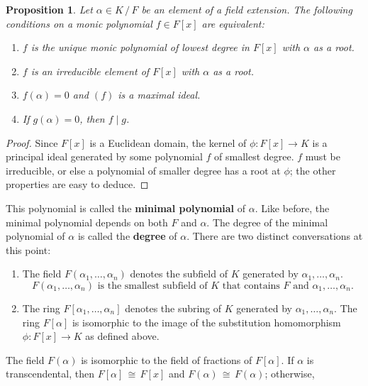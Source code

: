\documentclass[11pt]{article}
\newtheorem{proposition}{Proposition}
\begin{document}
\begin{adjustwidth}{0.5cm}{}
  \begin{proposition}
    Let $\alpha \in K \, / \, F$ be an element of a field extension. The following conditions on a monic polynomial $f \in F[x]$ are equivalent:
    \begin{enumerate}
      \item $f$ is the unique monic polynomial of lowest degree in $F[x]$ with $\alpha$ as a root.
      \item $f$ is an irreducible element of $F[x]$ with $\alpha$ as a root.
      \item $f(\alpha) = 0$ and $(f)$ is a maximal ideal.
      \item If $g(\alpha) = 0$, then $f \mid g$.
    \end{enumerate}
  \end{proposition}
  \begin{proof}
    Since $F[x]$ is a Euclidean domain, the kernel of $\phi : F[x] \to K$ is a principal ideal generated by some polynomial $f$ of smallest degree. $f$ must be irreducible, or else a polynomial of smaller degree has a root at $\phi$; the other properties are easy to deduce.
  \end{proof}
\end{adjustwidth}
This polynomial is called the \textbf{minimal polynomial} of $\alpha$. Like before, the minimal polynomial depends on both $F$ and $\alpha$. The degree of the minimal polynomial of $\alpha$ is called the \textbf{degree} of $\alpha$. There are two distinct conversations at this point:
\begin{enumerate}
  \item The field $F(\alpha_{1}, \ldots, \alpha_{n})$ denotes the subfield of $K$ generated by $\alpha_{1}, \ldots, \alpha_{n}$.
  \[
    \text{$F(\alpha_{1}, \ldots, \alpha_{n})$ is the smallest subfield of $K$ that contains $F$ and $\alpha_{1}, \ldots, \alpha_{n}$}.
  \]
  \item The ring $F[\alpha_{1}, \ldots, \alpha_{n}]$ denotes the subring of $K$ generated by $\alpha_{1}, \ldots, \alpha_{n}$. The ring $F[\alpha]$ is isomorphic to the image of the substitution homomorphism $\phi : F[x] \to K$ as defined above.
\end{enumerate}
The field $F(\alpha)$ is isomorphic to the field of fractions of $F[\alpha]$. If $\alpha$ is transcendental, then $F[\alpha] \, \cong \, F[x]$ and $F(\alpha) \, \cong \, F(\alpha)$; otherwise,
\end{document}
